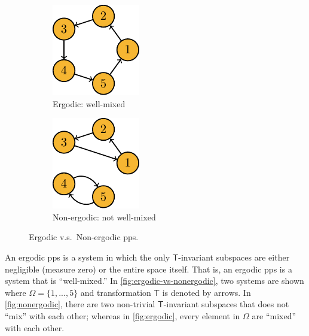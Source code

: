 \documentclass[a4paper]{article}
\begin{document}
\begin{figure}[h]
	\centering
	\begin{subfigure}{0.4\textwidth}
		\centering
		\includegraphics[scale=1]{figures/ergodic-mixing.pdf}
		\caption{Ergodic: well-mixed}
		\label{fig:ergodic}
	\end{subfigure}
	\begin{subfigure}{0.4\textwidth}
		\centering
		\includegraphics[scale=1]{figures/nonergodic-mixing.pdf}
		\caption{Non-ergodic: not well-mixed}
		\label{fig:nonergodic}
	\end{subfigure}
	\caption{Ergodic v.s.\ Non-ergodic \gls{pps}.}
	\label{fig:ergodic-vs-nonergodic}
\end{figure}

\begin{remark}
	An ergodic \gls{pps} is a system in which the only $\mathsf{T}$-invariant subspaces
	are either negligible (measure zero) or the entire space itself.
	That is, an ergodic \gls{pps} is a system that is ``well-mixed.''
	In \autoref{fig:ergodic-vs-nonergodic},
	two systems are shown
	where $\Omega=\{1,...,5\}$ and transformation $\mathsf{T}$ is denoted by arrows.
	In \autoref{fig:nonergodic}, there are two non-trivial $\mathsf{T}$-invariant subspaces that does not ``mix'' with each other;
	whereas in \autoref{fig:ergodic}, every element in $\Omega$ are ``mixed'' with each other.
\end{remark}
\end{document}
